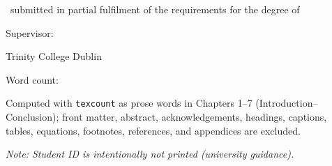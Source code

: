 
\begin{titlepage}
\centering

\vspace*{2cm}

{\Huge\bfseries \thesistitle \par}
\vspace{1.5cm}

{\Large \authorname \par}
\vspace{0.5cm}

{\large \typeofthesis\ submitted in partial fulfilment of the requirements for the degree of\par}
\vspace{0.3cm}
{\Large \degree \par}
\vspace{1.2cm}

{\large \school \par}
\vspace{0.2cm}
{\large \department \par}
\vspace{1.2cm}

{\large Supervisor: \supervisor \par}
\vspace{0.5cm}

{\large Trinity College Dublin \par}
{\large \submissiondate \par}
\vspace{3cm}
{\small Word count: \par}
{\scriptsize Computed with \texttt{texcount} as prose words in Chapters 1--7 (Introduction--Conclusion); front matter, abstract, acknowledgements, headings, captions, tables, equations, footnotes, references, and appendices are excluded.\par}

\vfill

{\small \textit{Note: Student ID is intentionally not printed (university guidance).}\par}

\end{titlepage}

